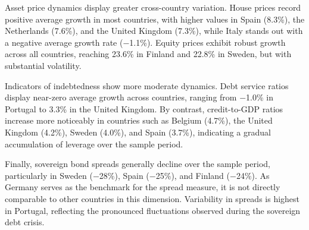 Asset price dynamics display greater cross-country variation. House prices record positive average growth in most countries, with higher values in Spain (8.3\%), the Netherlands (7.6\%), and the United Kingdom (7.3\%), while Italy stands out with a negative average growth rate ($-$1.1\%). Equity prices exhibit robust growth across all countries, reaching 23.6\% in Finland and 22.8\% in Sweden, but with substantial volatility.

Indicators of indebtedness show more moderate dynamics. Debt service ratios display near-zero average growth across countries, ranging from $-$1.0\% in Portugal to 3.3\% in the United Kingdom. By contrast, credit-to-GDP ratios increase more noticeably in countries such as Belgium (4.7\%), the United Kingdom (4.2\%), Sweden (4.0\%), and Spain (3.7\%), indicating a gradual accumulation of leverage over the sample period.

Finally, sovereign bond spreads generally decline over the sample period, particularly in Sweden ($-$28\%), Spain ($-$25\%), and Finland ($-$24\%). As Germany serves as the benchmark for the spread measure, it is not directly comparable to other countries in this dimension. Variability in spreads is highest in Portugal, reflecting the pronounced fluctuations observed during the sovereign debt crisis.


